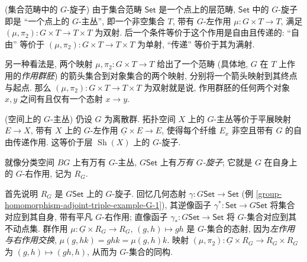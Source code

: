 %	

\begin{example}
	{(集合范畴中的 $G$-旋子)}
	由于集合范畴 $\mathsf {Set}$ 是一个点上的层范畴,
	$\mathsf {Set}$ 中的 $G$-旋子即是 ``一个点上的 $G$-主丛'',
	即一个非空集合 $T$, 带有 $G$-左作用 $\mu\colon G\times T \to T$, 满足 $(\mu,\pi_2)\colon G\times T \to T\times T$ 为双射.
	后一个条件等价于这个作用是自由且传递的:
	``自由'' 等价于 $(\mu,\pi_2)\colon G\times T \to T\times T$ 为单射, ``传递'' 等价于其为满射.
	
	另一种看法是, 两个映射 $\mu,\pi_2\colon G\times T \to T$ 给出了一个范畴 (具体地, $G$ 在 $T$ 上作用的\emph{作用群胚}) 的箭头集合到对象集合的两个映射, 分别将一个箭头映射到其终点与起点. 那么 $(\mu,\pi_2)\colon G\times T \to T\times T$ 为双射就是说, 作用群胚的任何两个对象 $x,y$ 之间有且仅有一个态射 $x\to y$.
\end{example}

\begin{example}
	{(空间上的 $G$-主丛)}
	仍设 $G$ 为离散群. 拓扑空间 $X$ 上的 $G$-主丛等价于平展映射 $E \to X$, 带有 $X$ 上的 $G$-左作用 $\underline G\times E \to E$, 使得每个纤维 $E_x$ 非空且带有 $G$ 的自由传递作用. 这等价于层\topos{} $\operatorname{Sh}(X)$ 上的 $G$-旋子.
\end{example}

就像分类空间 $BG$ 上有万有 $G$-主丛, \topos{} $G\mathsf {Set}$ 上有\emph{万有 $G$-旋子}; 它就是 $G$ 在自身上的 $G$-右作用, 记为 $R_G$.

首先说明 $R_G$ 是 $G\mathsf {Set}$ 上的 $G$-旋子.
回忆几何态射 $\gamma\colon G\mathsf {Set} \to \mathsf {Set}$ (例 \ref{group-homomorphism-adjoint-triple-example-G-1}), 其逆像函子 $\gamma^*\colon \mathsf {Set} \to G\mathsf {Set}$ 将集合对应到其自身, 带有平凡 $G$-右作用; 直像函子 $\gamma_*\colon G\mathsf {Set}\to\mathsf {Set}$ 将 $G$-集合对应到其不动点集.
群作用 $\mu\colon \underline G\times R_G \to R_G$, $(g,h)\mapsto gh$ 是 $G$-集合的态射, 因为\emph{左作用与右作用交换},  $\mu(g,hk)=ghk=\mu(g,h)k$.
映射 $(\mu,\pi_2)\colon \underline G\times R_G\to R_G\times R_G$ 为 $(g,h)\mapsto (gh,h)$, 从而为 $G$-集合的同构.

